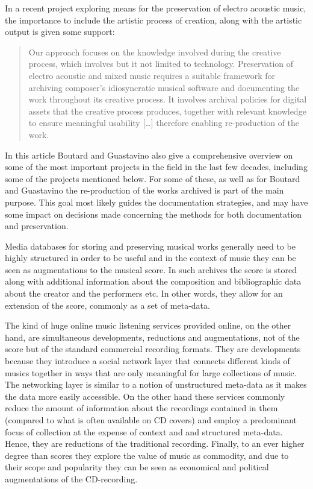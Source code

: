 \documentclass[11pt,a4paper]{article}
\begin{document}
In a recent project exploring means for the preservation of electro acoustic music, the importance to include the artistic process of creation, along with the artistic output is given some support:
\begin{quote}
  Our approach focuses on the knowledge involved during the creative process, which involves but it not limited to technology. Preservation of electro acoustic and mixed music requires a suitable framework for archiving composer’s idiosyncratic musical software and documenting the work throughout its creative process. It involves archival policies for digital assets that the creative process produces, together with relevant knowledge to ensure meaningful usability [\ldots] therefore enabling re-production of the work. \cite{boutard2012}
\end{quote}
In this article Boutard and Guastavino also give a comprehensive overview on some of the most important projects in the field in the last few decades, including some of the projects mentioned below. For some of these, as well as for Boutard and Guastavino the re-production of the works archived is part of the main purpose. This goal most likely guides the documentation strategies, and may have some impact on decisions made concerning the methods for both documentation and preservation.

Media databases for storing and preserving musical works generally need to be highly structured in order to be useful and in the context of music they can be seen as augmentations to the musical score. In such archives the score is stored along with additional information about the composition and bibliographic data about the creator and the performers etc. In other words, they allow for an extension of the score, commonly as a set of meta-data.

The kind of huge online music listening services provided online, on the other hand, are simultaneous developments, reductions and augmentations, not of the score but of the standard commercial recording formats. They are developments because they introduce a social network layer that connects different kinds of musics together in ways that are only meaningful for large collections of music. The networking layer is similar to a notion of unstructured meta-data as it makes the data more easily accessible. On the other hand these services commonly reduce the amount of information about the recordings contained in them (compared to what is often available on CD covers) and employ a predominant focus of collection at the expense of context and and structured meta-data. Hence, they are reductions of the traditional recording. Finally, to an ever higher degree than scores they explore the value of music as commodity, and due to their scope and popularity they can be seen as economical and political augmentations of the CD-recording.
\end{document}
